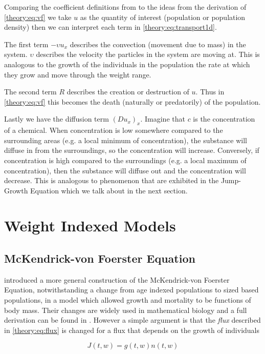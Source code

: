 \documentclass[../main.tex]{subfiles}
\begin{document}
  Comparing the coefficient definitions from \cite{stocker2011} to the ideas from the derivation of \autoref{theory:eq:vf} we take $u$ as the quantity of interest (population or population density) then we can interpret each term in \autoref{theory:eq:transport1d}.

  The first term $-\upsilon u_x$ describes the convection (movement due to mass) in the system. $\upsilon$ describes the velocity the particles in the system are moving at. This is analogous to the growth of the individuals in the population the rate at which they grow and move through the weight range.

  The second term $R$ describes the creation or destruction of $u$. Thus in \autoref{theory:eq:vf} this becomes the death (naturally or predatorily) of the population.

  Lastly we have the diffusion term $(D u_x)_x$. Imagine that $c$ is the concentration of a chemical. When concentration is low somewhere compared to the surrounding areas (e.g. a local minimum of concentration), the substance will diffuse in from the surroundings, so the concentration will increase. Conversely, if concentration is high compared to the surroundings (e.g. a local maximum of concentration), then the substance will diffuse out and the concentration will decrease. This is analogous to phenomenon that are exhibited in the Jump-Growth Equation which we talk about in the next section.

  \section{Weight Indexed Models}
  \subsection{McKendrick-von Foerster Equation}\label{theory:sec:mvf}
  \cite{silvert1978} introduced a more general construction of the McKendrick-von Foerster Equation, notwithstanding a change from age indexed populations to sized based populations, in a model which allowed growth and mortality to be functions of body mass. Their changes are widely used in mathematical biology and a full derivation can be found in \cite{silvert1978}. However a simple argument is that the \emph{flux} described in \autoref{theory:eq:flux} is changed for a flux that depends on the growth of individuals

  \begin{equation}
    J(t, w) = g(t, w) n(t, w)
  \end{equation}
\end{document}
